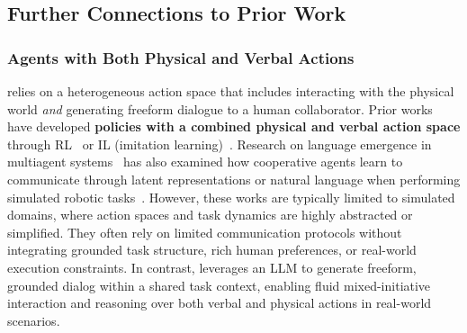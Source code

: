 \subsection{Further Connections to Prior Work}
\label{app:extra-related-work}
\subsubsection{Agents with Both Physical and Verbal Actions}
\methodname{} relies on a heterogeneous action space that includes interacting with the physical world \textit{and} generating freeform dialogue to a human collaborator. 
Prior works have developed \textbf{policies with a combined physical and verbal action space} through RL~\cite{Das2017ICCV, shervedani2024multimodalreinforcementlearningrobots}
or IL (imitation learning)~\cite{padmakumar2022teach, deepmindinteractiveagentsteam2022creatingmultimodalinteractiveagents}. 
Research on language emergence in multiagent systems~\cite{Peters_2025, kottur-etal-2017-natural} has also examined how cooperative agents learn to communicate through latent representations or natural language when performing simulated robotic tasks~\cite{lin2021learninggroundmultiagentcommunication, lowe2020interactionsupervisionselfplayemergent, woodward2019learninginteractivelylearnassist, lobostsunekawa2022madreamercoordinationcommunicationshared, kolb2019learningrequestguidanceemergent}. However, these works are typically limited to simulated domains, where action spaces and task dynamics are highly abstracted or simplified. They often rely on limited communication protocols without integrating grounded task structure, rich human preferences, or real-world execution constraints.
In contrast, \methodname{} leverages an LLM to generate freeform, grounded dialog within a shared task context, enabling fluid mixed-initiative interaction and reasoning over both verbal and physical actions in real-world scenarios.

